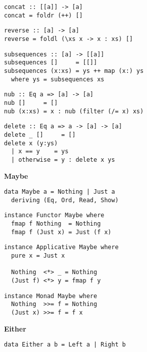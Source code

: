 \begin{multicols}{2}
\begin{verbatim}
concat :: [[a]] -> [a]
concat = foldr (++) []
\end{verbatim}

\begin{verbatim}
reverse :: [a] -> [a]
reverse = foldl (\xs x -> x : xs) []
\end{verbatim}
	
\begin{verbatim}
subsequences :: [a] -> [[a]]
subsequences []     = [[]]
subsequences (x:xs) = ys ++ map (x:) ys
  where ys = subsequences xs
\end{verbatim}

\begin{verbatim}
nub :: Eq a => [a] -> [a]
nub []     = []
nub (x:xs) = x : nub (filter (/= x) xs)
\end{verbatim}

\begin{verbatim}
delete :: Eq a => a -> [a] -> [a]
delete _ []     = []
delete x (y:ys) 
  | x == y    = ys
  | otherwise = y : delete x ys
\end{verbatim}
	
\textbf{\large Maybe}\\

\begin{verbatim}
data Maybe a = Nothing | Just a
  deriving (Eq, Ord, Read, Show)
\end{verbatim}

\begin{verbatim}
instance Functor Maybe where
  fmap f Nothing  = Nothing
  fmap f (Just x) = Just (f x)
\end{verbatim}

\begin{verbatim}
instance Applicative Maybe where
  pure x = Just x

  Nothing  <*> _ = Nothing
  (Just f) <*> y = fmap f y
\end{verbatim}

\begin{verbatim}
instance Monad Maybe where
  Nothing  >>= f = Nothing
  (Just x) >>= f = f x
\end{verbatim}
	
\textbf{\large Either}\\
	
\begin{verbatim}
data Either a b = Left a | Right b
\end{verbatim}


\end{multicols}
